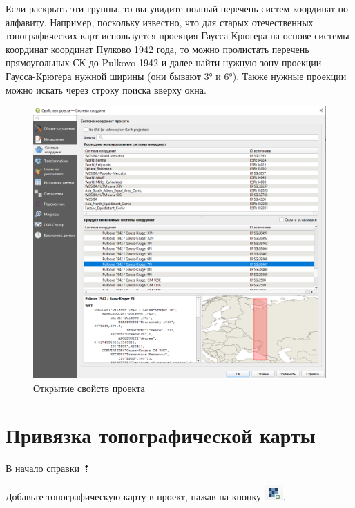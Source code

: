 \documentclass[
  12pt,
]{book}
\begin{document}
Если раскрыть эти группы, то вы увидите полный перечень систем координат по алфавиту. Например, поскольку известно, что для старых отечественных топографических карт используется проекция Гаусса-Крюгера на основе системы координат координат Пулково 1942 года, то можно пролистать перечень прямоугольных СК до Pulkovo 1942 и далее найти нужную зону проекции Гаусса-Крюгера нужной ширины (они бывают 3° и 6°). Также нужные проекции можно искать через строку поиска вверху окна.

\begin{figure}
\centering
\includegraphics{images/Georeference/Gauss_7N.png}
\caption{Открытие свойств проекта}
\end{figure}

\section{Привязка топографической карты}\label{georeference-topo}

\hyperref[georeference]{В начало справки ⇡}

Добавьте топографическую карту в проект, нажав на кнопку \includegraphics{images/Georeference/Open_raster.png}.
\end{document}
